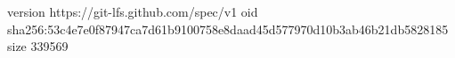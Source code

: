 version https://git-lfs.github.com/spec/v1
oid sha256:53c4e7e0f87947ca7d61b9100758e8daad45d577970d10b3ab46b21db5828185
size 339569
